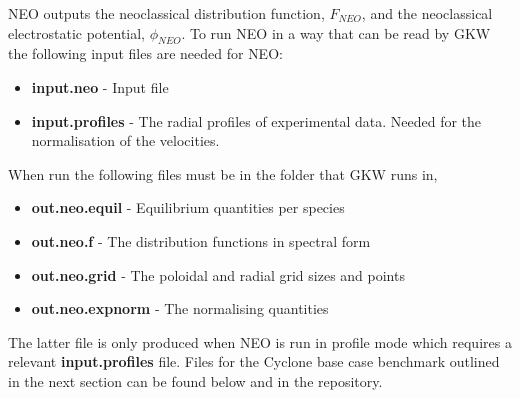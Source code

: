 {\small NEO} outputs the neoclassical distribution function, $F_{NEO}$, and the neoclassical electrostatic 
potential, $\phi_{NEO}$.   To run {\small NEO} in a way that can be read by {\small GKW} the following input files are needed for  {\small NEO}:
\begin{itemize}
\item {\bf input.neo} - Input file
\item {\bf input.profiles} - The radial profiles of experimental data.  Needed for the normalisation of the velocities.
\end{itemize}
When run the following files must be in the folder that {\small GKW} runs in,
\begin{itemize}
\item {\bf out.neo.equil} - Equilibrium quantities per species
\item {\bf out.neo.f} - The distribution functions in spectral form
\item {\bf out.neo.grid} - The poloidal and radial grid sizes and points
\item {\bf out.neo.expnorm} - The normalising quantities
\end{itemize}
The latter file is only produced when {\small NEO} is run in profile mode which requires a relevant {\bf input.profiles} file.  Files for the Cyclone base case benchmark outlined in the next section can be found below and in the repository.


